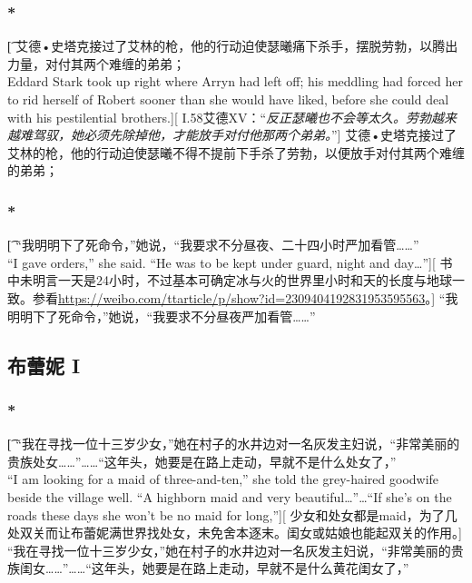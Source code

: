 \documentclass[12pt,a4paper]{article}
\begin{document}
\subsubsection{\color{red}*}\t[
	艾德•史塔克接过了艾林的枪，他的行动迫使瑟曦痛下杀手，摆脱劳勃，以腾出力量，对付其两个难缠的弟弟；\\
	Eddard Stark took up right where Arryn had left off; his meddling had forced her to rid herself of Robert sooner than she would have liked, before she could deal with his pestilential brothers.][
	I.58艾德XV：“\emph{反正瑟曦也不会等太久。劳勃越来越难驾驭，她必须先除掉他，才能放手对付他那两个弟弟。}”]
	艾德•史塔克接过了艾林的枪，他的行动迫使瑟曦不得不提前下手杀了劳勃，以便放手对付其两个难缠的弟弟；
	
\subsubsection{\color{red}*}\t[
	“我明明下了死命令，”她说，“我要求不分昼夜、二十四小时严加看管……”\\
	“I gave orders,” she said. “He was to be kept under guard, night and day\ldots”][
	书中未明言一天是24小时，不过基本可确定冰与火的世界里小时和天的长度与地球一致。参看\url{https://weibo.com/ttarticle/p/show?id=2309404192831953595563}。]
	“我明明下了死命令，”她说，“我要求不分昼夜严加看管……”	

\subsection{布蕾妮 I}
\subsubsection{\color{red}*}\t[
	“我在寻找一位十三岁少女，”她在村子的水井边对一名灰发主妇说，“非常美丽的贵族处女……”……“这年头，她要是在路上走动，早就不是什么处女了，”\\
	“I am looking for a maid of three-and-ten,” she told the grey-haired goodwife beside the village well. “A highborn maid and very beautiful\ldots”\ldots “If she's on the roads these days she won't be no maid for long,”][
	少女和处女都是maid，为了几处双关而让布蕾妮满世界找处女，未免舍本逐末。闺女或姑娘也能起双关的作用。]
		“我在寻找一位十三岁少女，”她在村子的水井边对一名灰发主妇说，“非常美丽的贵族闺女……”……“这年头，她要是在路上走动，早就不是什么黄花闺女了，”
\end{document}

